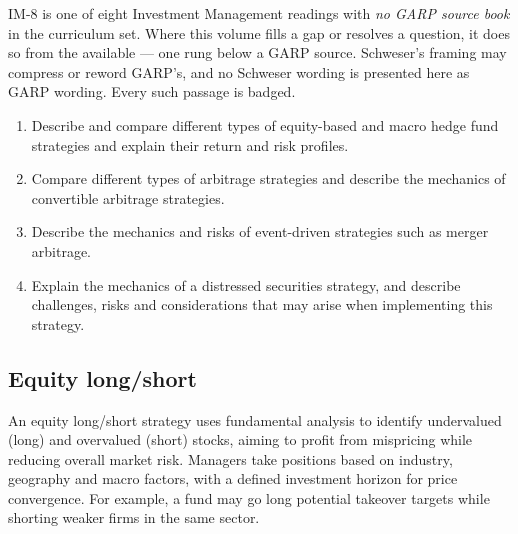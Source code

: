 

\begin{imtrapbox}[breakable=false,title={No GARP source exists for this reading}]
IM-8 is one of eight Investment Management readings with \emph{no GARP source
book} in the curriculum set. Where this volume fills a gap or resolves a
question, it does so from the available  --- one rung
below a GARP source. Schweser's framing may compress or reword GARP's, and no
Schweser wording is presented here as GARP wording. Every such passage is badged.
\end{imtrapbox}

\begin{imkeybox}[title={The four objectives in this reading}]
\begin{enumerate}[label=\textbf{\alph*.}]
\item Describe and compare different types of equity-based and macro hedge fund strategies and explain their return and risk profiles.
\item Compare different types of arbitrage strategies and describe the mechanics of convertible arbitrage strategies.
\item Describe the mechanics and risks of event-driven strategies such as merger arbitrage.
\item Explain the mechanics of a distressed securities strategy, and describe challenges, risks and considerations that may arise when implementing this strategy.
\end{enumerate}
\end{imkeybox}


\subsection{Equity long/short}

An equity long/short strategy uses fundamental analysis to identify undervalued
(long) and overvalued (short) stocks, aiming to profit from mispricing while
reducing overall market risk. Managers take positions based on industry,
geography and macro factors, with a defined investment horizon for price
convergence. For example, a fund may go long potential takeover targets while
shorting weaker firms in the same sector.

